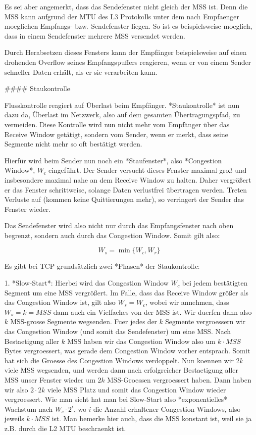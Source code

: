 Es sei aber angemerkt, dass das Sendefenster nicht gleich der MSS ist. Denn die
MSS kann aufgrund der MTU des L3 Protokolls unter dem nach Empfaenger moeglichen
Empfangs- bzw. Sendefenster liegen. So ist es beispielsweise moeglich, dass in
einem Sendefenster mehrere MSS versendet werden.

Durch Herabsetzen dieses Fensters kann der Empfänger beispielsweise auf einen
drohenden Overflow seines Empfangspuffers reagieren, wenn er von einem Sender
schneller Daten erhält, als er sie verarbeiten kann.

#### Staukontrolle

Flusskontrolle reagiert auf Überlast beim Empfänger. *Staukontrolle* ist nun
dazu da, Überlast im Netzwerk, also auf dem gesamten Übertragungspfad, zu
vermeiden. Diese Kontrolle wird nun nicht mehr vom Empfänger über das Receive
Window getätigt, sondern vom Sender, wenn er merkt, dass seine Segmente nicht
mehr so oft bestätigt werden.

Hierfür wird beim Sender nun noch ein *Staufenster*, also *Congestion Window*,
$W_c$ eingeführt. Der Sender versucht dieses Fenster maximal groß und
insbesondere maximal nahe an dem Receive Window zu halten. Daher vergrößert er
das Fenster schrittweise, solange Daten verlustfrei übertragen werden. Treten
Verluste auf (kommen keine Quittierungen mehr), so verringert der Sender das
Fenster wieder.

Das Sendefenster wird also nicht nur durch das Empfangsfenster nach oben
begrenzt, sondern auch durch das Congestion Window. Somit gilt also:

$$W_s = \min\{W_c, W_r\}$$

Es gibt bei TCP grundsätzlich zwei *Phasen* der Staukontrolle:

1. *Slow-Start*: Hierbei wird das Congestion Window $W_c$ bei jedem bestätigten
   Segment um eine MSS vergrößert. Im Falle, dass das Receive Window größer als
   das Congestion Window ist, gilt also $W_s = W_c$, wobei wir annehmen, dass
   $W_s = k = MSS$ dann auch ein Vielfaches von der MSS ist. Wir duerfen dann
   also $k$ MSS-grosse Segmente wegsenden. Fuer jedes der $k$ Segmente
   vergroessern wir das Congestion Window (und somit das Sendefenster) um eine
   MSS. Nach Bestaetigung aller $k$ MSS haben wir das Congestion Window also um
   $k \cdot MSS$ Bytes vergroessert, was gerade dem Congestion Window vorher
   entsprach. Somit hat sich die Groesse des Congestion Windows verdoppelt. Nun
   koennen wir $2k$ viele MSS wegsenden, und werden dann nach erfolgreicher
   Bestaetigung aller MSS unser Fenster wieder um $2k$ MSS-Groessen vergroessert
   haben. Dann haben wir also $2 \cdot 2k$ viele MSS Platz und somit das
   Congestion Window wieder vergroessert. Wie man sieht hat man bei Slow-Start
   also *exponentielles* Wachstum nach $W_c \cdot 2^i$, wo $i$ die Anzahl
   erhaltener Congestion Windows, also jeweils $k \cdot MSS$ ist. Man bemerke
   hier auch, dass die MSS konstant ist, weil sie ja z.B. durch die L2 MTU
   beschraenkt ist.

